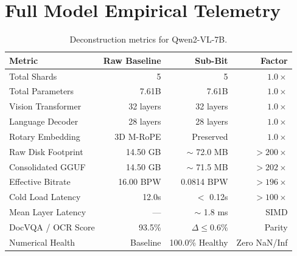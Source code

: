 \documentclass[10pt,twocolumn,letterpaper]{article}
\begin{document}
\section{Full Model Empirical Telemetry}
\begin{table}[h]
\centering
\small
\begin{tabular}{lrrr}
\toprule
\textbf{Metric} & \textbf{Raw Baseline} & \textbf{Sub-Bit} & \textbf{Factor} \\
\midrule
Total Shards & 5 & 5 & $1.0\times$ \\
Total Parameters & 7.61B & 7.61B & $1.0\times$ \\
Vision Transformer & 32 layers & 32 layers & $1.0\times$ \\
Language Decoder & 28 layers & 28 layers & $1.0\times$ \\
Rotary Embedding & 3D M-RoPE & Preserved & $1.0\times$ \\
Raw Disk Footprint & 14.50 GB & $\sim$ 72.0 MB & \textbf{$>200\times$} \\
Consolidated GGUF & 14.50 GB & $\sim$ 71.5 MB & \textbf{$>202\times$} \\
Effective Bitrate & 16.00 BPW & 0.0814 BPW & \textbf{$>196\times$} \\
Cold Load Latency & 12.0s & $<$ 0.12s & \textbf{$>100\times$} \\
Mean Layer Latency & --- & $\sim$ 1.8 ms & SIMD \\
DocVQA / OCR Score & 93.5\% & $\Delta \le 0.6\%$ & Parity \\
Numerical Health & Baseline & 100.0\% Healthy & Zero NaN/Inf \\
\bottomrule
\end{tabular}
\caption{Deconstruction metrics for Qwen2-VL-7B.}
\end{table}
\end{document}
